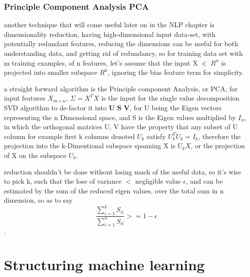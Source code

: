 \documentclass[4apaper,12pt]{book}
\begin{document}
\begin{description}
    \subsection{Principle Component Analysis  PCA}
    \begin{description}
    \item another technique that will come useful later on in the NLP chapter is dimensionality reduction, having high-dimensional input data-set, with potentially redundant features, reducing the dimensions can be useful for both understanding data, and getting rid of redundancy, so for training data set with m training examples, of n features, let's assume that the input X $\in$ $R^{n}$ is projected into smaller subspace $R^{k}$, ignoring the bias feature term for simplicity.
    \item a straight forward algorithm is the Principle component Analysis, or PCA, for input features $X_{m\times{n}}$, $\Sigma=X^TX$ is the input for the single value decomposition SVD algorithm to de-factor it into $\textbf{U }\textbf{S }\textbf{V}$, for U being the Eigen vectors representing the n Dimensional space, and S is the Eigen values multiplied by $I_n$, in which the orthogonal matrices U, V have the property that any subset of U column for example first k columns denoted $U_k$ satisfy $U_k^TU_k=I_k$, therefore the projection into the k-Dimentional subspace spanning X is $U_kX$, or the projection of X on the subspace $U_k$.
    \item reduction shouldn't be done without losing much of the useful data, so it's wise to pick k, such that the lose of variance $<$ negligible value $\epsilon$, and can be estimated by the sum of the reduced eigen values, over the total sum in n dimension, so as to say $$\frac{\sum_{i=1}^kS_{ii}}{\sum_{i=1}^nS_{ii}} >= 1-\epsilon$$.

    \end{description}
  \end{description}

  \chapter{Structuring machine learning}
\end{document}
